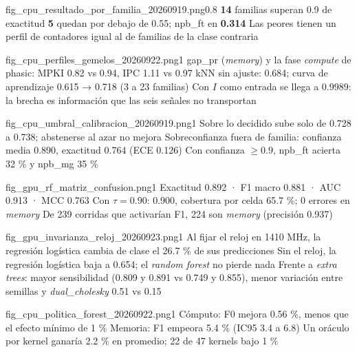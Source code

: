   {fig_cpu_resultado_por_familia_20260919.png}{0.8}
  {\textbf{14} familias superan 0.9 de exactitud}
  {\textbf{5} quedan por debajo de 0.55; npb\_ft en \textbf{0.314}}
  {Las peores tienen un perfil de contadores igual al de familias de la clase contraria}

  {fig_cpu_perfiles_gemelos_20260922.png}{1}
  {gap\_pr (\textit{memory}) y la fase \textit{compute} de phasic: MPKI 0.82 vs 0.94, IPC 1.11 vs 0.97}
  {kNN sin ajuste: 0.684; curva de aprendizaje 0.615 → 0.718 (3 a 23 familias)}
  {Con $I$ como entrada se llega a 0.9989: la brecha es información que las seis señales no transportan}

  {fig_cpu_umbral_calibracion_20260919.png}{1}
  {Sobre lo decidido sube solo de 0.728 a 0.738; abstenerse al azar no mejora}
  {Sobreconfianza fuera de familia: confianza media 0.890, exactitud 0.764 (ECE 0.126)}
  {Con confianza $\ge 0.9$, npb\_ft acierta 32 \% y npb\_mg 35 \%}


  {fig_gpu_rf_matriz_confusion.png}{1}
  {Exactitud 0.892 · F1 macro 0.881 · AUC 0.913 · MCC 0.763}
  {Con $\tau=0.90$: 0.900, cobertura por celda 65.7 \%; 0 errores en \textit{memory}}
  {De 239 corridas que activarían F1, 224 son \textit{memory} (precisión 0.937)}

  {fig_gpu_invarianza_reloj_20260923.png}{1}
  {Al fijar el reloj en 1410 MHz, la regresión logística cambia de clase el 26.7 \% de sus predicciones}
  {Sin el reloj, la regresión logística baja a 0.654; el \textit{random forest} no pierde nada}
  {Frente a \textit{extra trees}: mayor sensibilidad (0.809 y 0.891 vs 0.749 y 0.855), menor variación entre semillas y \textit{dual\_cholesky} 0.51 vs 0.15}


  {fig_cpu_politica_forest_20260922.png}{1}
  {Cómputo: F0 mejora 0.56 \%, menos que el efecto mínimo de 1 \%}
  {Memoria: F1 empeora 5.4 \% (IC95 3.4 a 6.8)}
  {Un oráculo por kernel ganaría 2.2 \% en promedio; 22 de 47 kernels bajo 1 \%}

